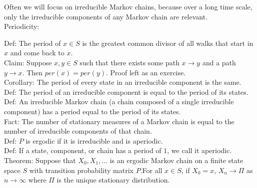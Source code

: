 \documentclass[english, 11pt]{article}
\begin{document}
Often we will focus on irreducible Markov chains, because over a long time scale, only the irreducible components of any Markov chain are relevant.\\

Periodicity:

Def: The period of $x \in S$ is the greatest common divisor of all walks that start in $x$ and come back to $x$.\\

Claim: Suppose $x, y \in S$ such that there exists some path $x \to y$ and a path $y \to x$. Then $per(x) = per(y)$. Proof left as an exercise.\\

Corollary: The period of every state in an irreducible component is the same.\\

Def: The period of an irreducible component is equal to the period of its states.\\

Def: An irreducible Markov chain (a chain composed of a single irreducible component) has a period equal to the period of its states.\\

Fact: The number of stationary measures of a Markov chain is equal to the number of irreducible components of that chain.\\

Def: $P$ is ergodic if it is irreducible and is aperiodic.\\

Def: If a state, component, or chain has a period of $1$, we call it aperiodic.\\

Theorem: Suppose that $X_0, X_1, \dots$ is an ergodic Markov chain on a finite state space $S$ with transition probability matrix $P$.For all $x \in S$, if $X_0 = x$, $X_n \to \Pi$ as $n \to \infty$ where $\Pi$ is the unique stationary distribution.
  
\end{document}
